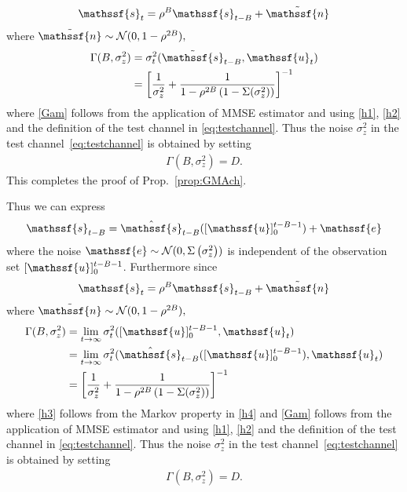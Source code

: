 \documentclass[journal, twocolumn, 10pt]{IEEEtran}
\newcommand{\cN}{{\mathcal{N}}}
\newcommand{\rve}{{\mathssf{e}}}    %
\newcommand{\rvn}{{\mathssf{n}}}    %
\newcommand{\rvs}{{\mathssf{s}}}    %
\newcommand{\rvu}{{\mathssf{u}}}    %
\begin{document}
{\begin{align}
\rvs_{t} = \rho^{B} \rvs_{t-B} + \tilde{\rvn}\label{h1}
\end{align} where $\tilde{\rvn} \sim \cN(0, 1-\rho^{2B}),$
\begin{align}
\Gamma(B,\sigma^{2}_{z})  &=\sigma^{2}_{t} (\tilde{\rvs}_{t-B}, \rvu_{t})\\
&= \left[ \frac{1}{\sigma^2_{z}} + \frac{1}{1-\rho^{2B}\left(1-\Sigma(\sigma^2_{z})\right)}\right]^{-1}\label{Gam}
\end{align} where \eqref{Gam} follows from the application of MMSE estimator and using \eqref{h1}, \eqref{h2} and the definition of the test channel in \eqref{eq:testchannel}. 
Thus the noise $\sigma_z^2$ in the test channel~\eqref{eq:testchannel} is obtained by setting
\begin{align}\Gamma(B,\sigma^{2}_{z}) = D. \label{eq:noise-eq}\end{align} 
This completes the proof of Prop.~\ref{prop:GMAch}.

\iffalse

Thus we can express
\begin{align}
\rvs_{t-B} = \hat{\rvs}_{t-B} ([\rvu]_{0}^{t-B-1}) + {\rve}\label{h2}
\end{align} where the noise $\rve \sim \cN(0, \Sigma\left(\sigma^{2}_{z} \right))$ is independent of the observation set $[\rvu]_{0}^{t-B-1}$. Furthermore since
\begin{align}
\rvs_{t} = \rho^{B} \rvs_{t-B} + \tilde{\rvn}\label{h1}
\end{align} where $\tilde{\rvn} \sim \cN(0, 1-\rho^{2B}),$
\begin{align}
\Gamma(B,\sigma^{2}_{z})  &= \lim_{t\to \infty }\sigma^{2}_{t} ([\rvu]_{0}^{t-B-1}, \rvu_{t})\\
& = \lim_{t\to \infty }\sigma^{2}_{t} (\hat{\rvs}_{t-B}([\rvu]_{0}^{t-B-1}), \rvu_{t})\label{h3}\\
&= \left[ \frac{1}{\sigma^2_{z}} + \frac{1}{1-\rho^{2B}\left(1-\Sigma(\sigma^2_{z})\right)}\right]^{-1}\label{Gam}
\end{align} where \eqref{h3} follows from the Markov property in \eqref{h4} and \eqref{Gam} follows from the application of MMSE estimator and using \eqref{h1}, \eqref{h2} and the definition of the test channel in \eqref{eq:testchannel}. 
Thus the noise $\sigma_z^2$ in the test channel~\eqref{eq:testchannel} is obtained by setting
\begin{align}\Gamma(B,\sigma^{2}_{z}) = D. \label{eq:noise-eq}\end{align} 


}
\end{document}
